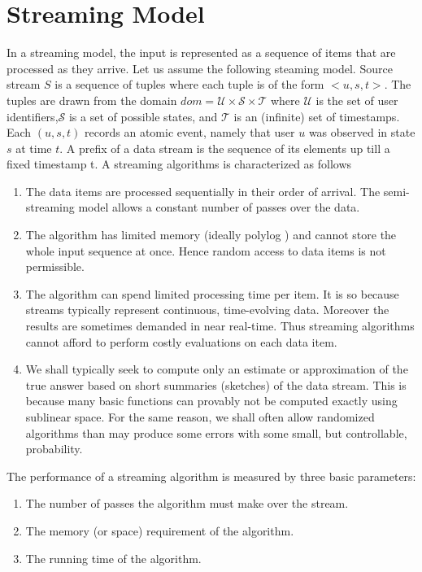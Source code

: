 \documentclass{article}
\theoremstyle{definition}
\begin{document}
\section{Streaming Model}
In a streaming model, the input is represented as a sequence of items that are processed as they arrive. Let us assume the following steaming model. Source stream $S$ is a sequence of tuples where each tuple is of the form $<u,s,t>$. The tuples are drawn from the domain $dom=\mathcal{U}\times\mathcal{S}\times\mathcal{T}$ where $\mathcal{U}$ is the set of user identifiers,$\mathcal{S}$ is a set of possible states, and $\mathcal{T}$ is an (infinite) set of timestamps. Each $(u, s, t )$ records an atomic event, namely that user $u$ was observed in state $s$ at time $t$. A prefix of a data stream is the sequence of  its elements up till a fixed timestamp t. A streaming algorithms is characterized as follows
 \begin{enumerate}\item The data items are processed sequentially in their order of arrival. The semi-streaming model allows a constant number of passes over the data.
\item The algorithm has limited memory (ideally polylog ) and cannot store the whole input sequence at once. Hence random access to data items is not permissible. 
\item The algorithm can spend limited processing time per item. It is so because streams typically represent continuous, time-evolving data. Moreover the results are sometimes demanded in  near real-time. Thus streaming algorithms cannot afford to perform costly evaluations on each data item.  
 \item We shall typically seek to compute only
an estimate or approximation of the true answer based on short summaries (sketches) of the data stream. This is because many basic functions can provably not be computed
exactly using sublinear space. For the same reason, we shall often allow randomized algorithms than may produce some errors with
some small, but controllable, probability. 
\end{enumerate} 
The performance of a streaming algorithm is measured by three basic parameters:
\begin{enumerate}\item The number of passes the algorithm must make over the stream.
\item The memory (or space) requirement of the algorithm. 
\item The running time of the algorithm.
\end{enumerate}
\end{document}
